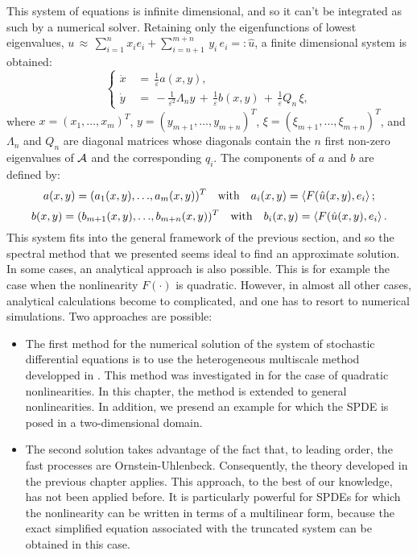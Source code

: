 This system of equations is infinite dimensional, and so it can't be integrated as such by a numerical solver.
Retaining only the eigenfunctions of lowest eigenvalues, $u\,\approx\, \sum^{n}_{i=1}x_i e_i + \sum_{i=n+1}^{m+n} \,y_{i}\,e_{i} =: \hat u$, a finite dimensional system is obtained:
\begin{equation}
    \left\{\begin{aligned}
            \dot x\,&=\,\frac 1 {\varepsilon}a(x, y) ,\\ \dot
            y\,&=\,-\frac 1 {\varepsilon^{2}} \Lambda_{n}  y\,+\,\frac 1 {\varepsilon}
            b(x,y)\,+\,\frac 1 \varepsilon Q_n\,{\xi},
        \end{aligned} \right.
    \label{eq: finite dimensional system of equations}
\end{equation}
where $x = (x_1, \dots, x_m)^{T}$, $y = (y_{m+1}, \dots, y_{m + n})^{T}$, $\xi= (\xi_{m+1}, \dots, \xi_{m+n})^{T}$, and $\Lambda_{n}$ and $Q_{n}$ are diagonal matrices whose diagonals contain the $n$ first non-zero eigenvalues of $\mathcal A$ and the corresponding $q_{i}$.
The components of $a$ and $b$ are defined by:
\begin{equation*}
    a(x, y) = (a_{1}(x,y), {\dots},a_{m}(x,y))^{T} \quad \text{with} \quad a_{i}(x,y) = \left \langle F(\hat u(x,y),e_i \right\rangle;
    \label{eq: coefficient a in the slow process}
\end{equation*}
\begin{equation}
    b(x, y) = (b_{m+1}(x,y), {\dots},b_{m+n}(x,y))^{T} \quad \text{with} \quad b_{i}(x,y) = \left \langle F(\hat u(x,y),e_i \right\rangle.
    \label{eq: coefficient b in the fast process}
\end{equation}
This system fits into the general framework of the previous section, and so the spectral method that we presented seems ideal to find an approximate solution.
In some cases, an analytical approach is also possible.
This is for example the case when the nonlinearity $F({\cdot})$ is quadratic.
However, in almost all other cases, analytical calculations become to complicated, and one has to resort to numerical simulations.
Two approaches are possible:
\begin{itemize}
    \item The first method for the numerical solution of the system of stochastic differential equations is to use the heterogeneous multiscale method developped in \cite{weinan2005analysis}.
        This method was investigated in \cite{abdulle2012numerical} for the case of quadratic nonlinearities.
        In this chapter, the method is extended to general nonlinearities. In addition, we presend an example for which the SPDE is posed in a two-dimensional domain.
    \item The second solution takes advantage of the fact that, to leading order, the fast processes are Ornstein-Uhlenbeck.
        Consequently, the theory developed in the previous chapter applies.
        This approach, to the best of our knowledge, has not been applied before.
        It is particularly powerful for SPDEs for which the nonlinearity can be written in terms of a multilinear form, because the exact simplified equation associated with the truncated system can be obtained in this case.
\end{itemize}

